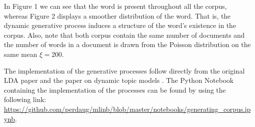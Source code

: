 \documentclass{article}
\begin{document}
In Figure 1 we can see that the word is present throughout all the corpus, whereas Figure 2 displays a smoother distribution of the word. That is, the dynamic generative process induces a structure of the word's existence in the corpus. Also, note that both corpus contain the same number of documents and the number of words in a document is drawn from the Poisson distribution on the same mean $\xi = 200$.

The implementation of the generative processes follow directly from the original LDA paper \cite{Blei:2003:LDA:944919.944937} and the paper on dynamic topic models \cite{Blei:2006:DTM:1143844.1143859}. The Python Notebook containing the implementation of the processes can be found by using the following link: \url{https://github.com/perdaug/mlinb/blob/master/notebooks/generating_corpus.ipynb}.



\end{document}
